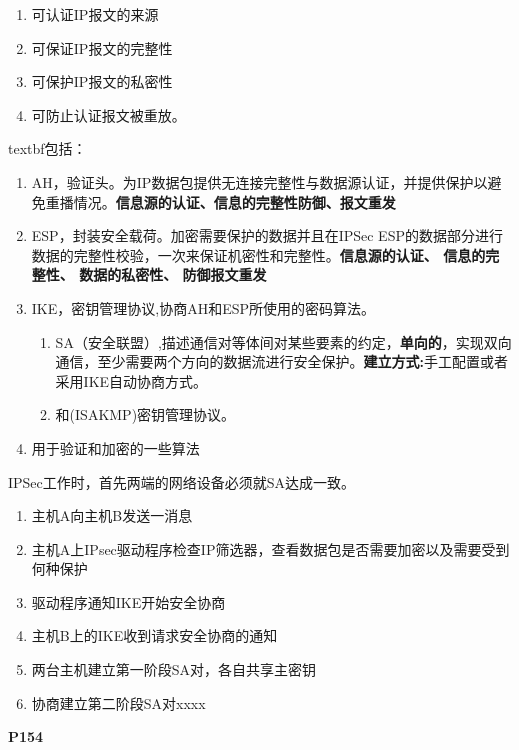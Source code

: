 \begin{enumerate}
\item 可认证IP报文的来源
\item 可保证IP报文的完整性
\item 可保护IP报文的私密性
\item 可防止认证报文被重放。
\end{enumerate}

textbf{包括：}
\begin{enumerate}
	\item AH，验证头。为IP数据包提供无连接完整性与数据源认证，并提供保护以避免重播情况。\textbf{信息源的认证、信息的完整性防御、报文重发}
	\item ESP，封装安全载荷。加密需要保护的数据并且在IPSec ESP的数据部分进行数据的完整性校验，一次来保证机密性和完整性。\textbf{信息源的认证、
	信息的完整性、
	数据的私密性、
	防御报文重发}
	\item IKE，密钥管理协议,协商AH和ESP所使用的密码算法。
	\begin{enumerate}
	\item SA（安全联盟）,描述通信对等体间对某些要素的约定，\textbf{单向的}，实现双向通信，至少需要两个方向的数据流进行安全保护。\textbf{建立方式:}手工配置或者采用IKE自动协商方式。
	\item 和(ISAKMP)密钥管理协议。
	\end{enumerate}
	\item 用于验证和加密的一些算法
\end{enumerate}
IPSec工作时，首先两端的网络设备必须就SA达成一致。

\begin{enumerate}
	\item 主机A向主机B发送一消息
	\item 主机A上IPsec驱动程序检查IP筛选器，查看数据包是否需要加密以及需要受到何种保护
	\item 驱动程序通知IKE开始安全协商
	\item 主机B上的IKE收到请求安全协商的通知
	\item 两台主机建立第一阶段SA对，各自共享主密钥
	\item 协商建立第二阶段SA对xxxx
\end{enumerate}
\textbf{P154}


